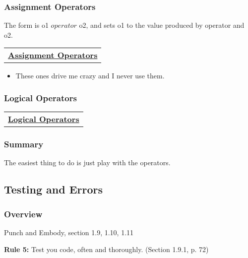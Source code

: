 \documentclass[11pt]{article}
\providecommand{\tightlist}{%
      \setlength{\itemsep}{0pt}\setlength{\parskip}{0pt}}
\begin{document}
    \subsubsection{Assignment Operators}\label{assignment-operators}

The form is o1 \(operator\) o2, and sets o1 to the value produced by
operator and o2.

\begin{longtable}[]{@{}c@{}}
\toprule
\tabularnewline
\midrule
\endhead
\href{https://www.tutorialspoint.com/python/python_basic_operators.htm}{\textbf{Assignment
Operators}}\tabularnewline
\bottomrule
\end{longtable}

    \begin{itemize}
\tightlist
\item
  These ones drive me crazy and I never use them.
\end{itemize}

    \subsubsection{Logical Operators}\label{logical-operators}

\begin{longtable}[]{@{}c@{}}
\toprule
\tabularnewline
\midrule
\endhead
\href{https://www.tutorialspoint.com/python/python_basic_operators.htm}{\textbf{Logical
Operators}}\tabularnewline
\bottomrule
\end{longtable}

    

    \subsubsection{Summary}\label{summary}

The easiest thing to do is just play with the operators.

    \subsection{Testing and Errors}\label{testing-and-errors}

\subsubsection{Overview}\label{overview}

Punch and Embody, section 1.9, 1.10, 1.11

\textbf{Rule 5:} Test you code, often and thoroughly. (Section 1.9.1, p.
72)
\end{document}
